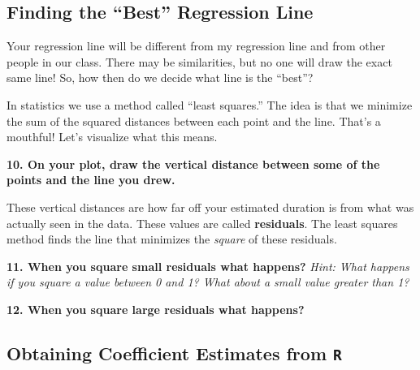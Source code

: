 \documentclass[
  letterpaper,
  DIV=11,
  numbers=noendperiod]{scrartcl}
\begin{document}
\hypertarget{finding-the-best-regression-line}{%
\subsection{Finding the ``Best'' Regression
Line}\label{finding-the-best-regression-line}}

Your regression line will be different from my regression line and from
other people in our class. There may be similarities, but no one will
draw the exact same line! So, how then do we decide what line is the
``best''?

In statistics we use a method called ``least squares.'' The idea is that
we minimize the sum of the squared distances between each point and the
line. That's a mouthful! Let's visualize what this means.

\textbf{10. On your plot, draw the vertical distance between some of the
points and the line you drew.}


\vspace{0.5cm}

These vertical distances are how far off your estimated duration is from
what was actually seen in the data. These values are called
\textbf{residuals}. The least squares method finds the line that
minimizes the \emph{square} of these residuals.

\vspace{0.5cm}

\textbf{11. When you square small residuals what happens?} \emph{Hint:
What happens if you square a value between 0 and 1? What about a small
value greater than 1?}


\vspace{0.5cm}

\textbf{12. When you square large residuals what happens?}


\vspace{0.5cm}

\hypertarget{obtaining-coefficient-estimates-from-r}{%
\subsection{\texorpdfstring{Obtaining Coefficient Estimates from
\texttt{R}}{Obtaining Coefficient Estimates from R}}\label{obtaining-coefficient-estimates-from-r}}
\end{document}
